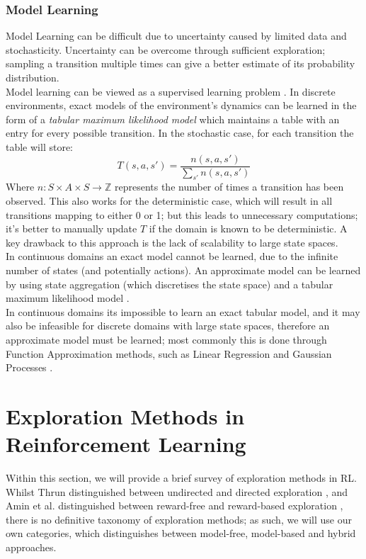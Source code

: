 \subsubsection{Model Learning}
Model Learning can be difficult due to uncertainty caused by limited data and stochasticity. Uncertainty can be overcome through sufficient exploration; sampling a transition multiple times can give a better estimate of its probability distribution.
\\Model learning can be viewed as a supervised learning problem \cite{JORDAN1992307}. In discrete environments, exact models of the environment's dynamics can be learned in the form of a \textit{tabular maximum likelihood model} \cite{10.1145/122344.122377} which  maintains a table with an entry for every possible transition.
In the stochastic case, for each transition the table will store:
\begin{equation}
\label{eqn:tmlmupdate}
T(s, a, s') = \frac{n(s, a, s')}{\sum_{s'}n(s,a,s')}
\end{equation}
Where $n : S \times A \times S \rightarrow \mathbb{Z}$ represents the number of times a transition has been observed. This also works for the deterministic case, which will result in all transitions mapping to either 0 or 1; but this leads to unnecessary computations; it's better to manually update $T$ if the domain is known to be deterministic.
A key drawback to this approach is the lack of scalability to large state spaces.
\\In continuous domains an exact model cannot be learned, due to the infinite number of states (and potentially actions). An approximate model can be learned by using state aggregation (which discretises the state space) and a tabular maximum likelihood model \cite{Kuvayev1996ModelBasedRL}.
\\In continuous domains its impossible to learn an exact tabular model, and it may also be infeasible for discrete domains with large state spaces, therefore an approximate model must be learned; most commonly this is done through Function Approximation methods, such as Linear Regression \cite{DBLP:journals/corr/abs-1206-3285, NIPS2007_b7bb35b9} and Gaussian Processes \cite{10.5555/3104482.3104541}.

\section{Exploration Methods in Reinforcement Learning}
Within this section, we will provide a brief survey of exploration methods in RL. Whilst Thrun distinguished between undirected and directed exploration \cite{Thrun-1992-15850}, and Amin et al. distinguished between reward-free and reward-based exploration \cite{DBLP:journals/corr/abs-2109-00157}, there is no definitive taxonomy of exploration methods; as such, we will use our own categories, which distinguishes between model-free, model-based and hybrid approaches.
